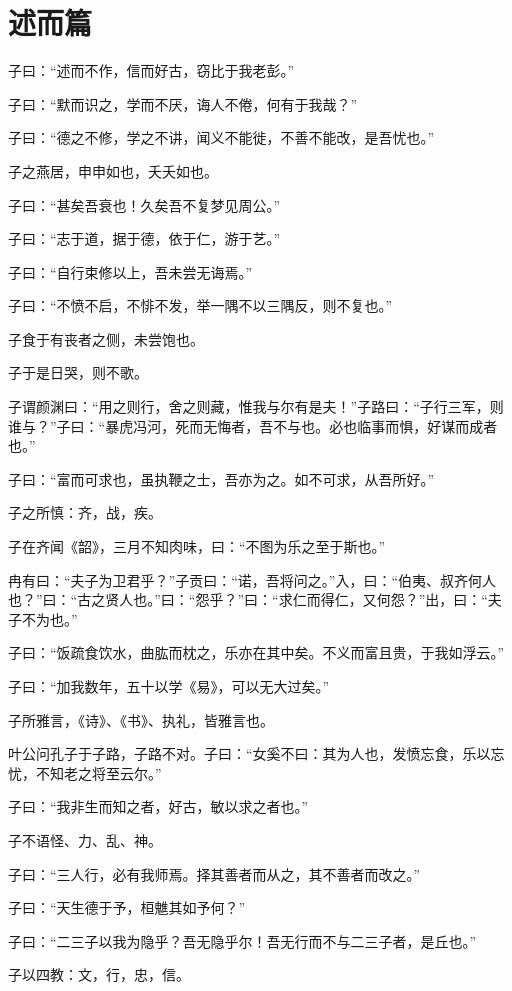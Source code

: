 \documentclass[12pt,a4paper]{ctexbook}
\begin{document}
\section{述而篇}
子曰：“述而不作，信而好古，窃比于我老彭。”\par
子曰：“默而识之，学而不厌，诲人不倦，何有于我哉？”\par
子曰：“德之不修，学之不讲，闻义不能徙，不善不能改，是吾忧也。”\par
子之燕居，申申如也，夭夭如也。\par
子曰：“甚矣吾衰也！久矣吾不复梦见周公。”\par
子曰：“志于道，据于德，依于仁，游于艺。”\par
子曰：“自行束修以上，吾未尝无诲焉。”\par
子曰：“不愤不启，不悱不发，举一隅不以三隅反，则不复也。”\par
子食于有丧者之侧，未尝饱也。\par
子于是日哭，则不歌。\par
子谓颜渊曰：“用之则行，舍之则藏，惟我与尔有是夫！”子路曰：“子行三军，则谁与？”子曰：“暴虎冯河，死而无悔者，吾不与也。必也临事而惧，好谋而成者也。”\par
子曰：“富而可求也，虽执鞭之士，吾亦为之。如不可求，从吾所好。”\par
子之所慎：齐，战，疾。\par
子在齐闻《韶》，三月不知肉味，曰：“不图为乐之至于斯也。”\par
冉有曰：“夫子为卫君乎？”子贡曰：“诺，吾将问之。”入，曰：“伯夷、叔齐何人也？”曰：“古之贤人也。”曰：“怨乎？”曰：“求仁而得仁，又何怨？”出，曰：“夫子不为也。”\par
子曰：“饭疏食饮水，曲肱而枕之，乐亦在其中矣。不义而富且贵，于我如浮云。”\par
子曰：“加我数年，五十以学《易》，可以无大过矣。”\par
子所雅言，《诗》、《书》、执礼，皆雅言也。\par
叶公问孔子于子路，子路不对。子曰：“女奚不曰：其为人也，发愤忘食，乐以忘忧，不知老之将至云尔。”\par
子曰：“我非生而知之者，好古，敏以求之者也。”\par
子不语怪、力、乱、神。\par
子曰：“三人行，必有我师焉。择其善者而从之，其不善者而改之。”\par
子曰：“天生德于予，桓魋其如予何？”\par
子曰：“二三子以我为隐乎？吾无隐乎尔！吾无行而不与二三子者，是丘也。”\par
子以四教：文，行，忠，信。\par
\end{document}
